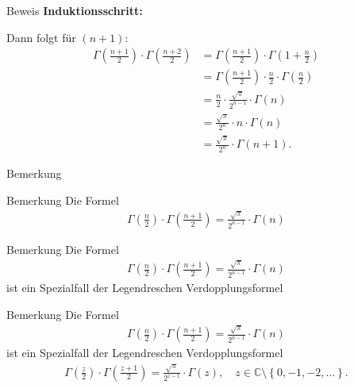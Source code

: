 \documentclass[10pt]{beamer}
\def\bC{\mathbb{C}}
\begin{document}
\begin{frame}{Beweis}
    \textbf{Induktionsschritt:}

    Dann folgt für \( \left( n + 1 \right) \):
    \begin{align*}
        \Gamma\left( \frac{n + 1}{2} \right) \cdot \Gamma\left( \frac{n + 2}{2} \right)
        & = \Gamma\left( \frac{n + 1}{2} \right) \cdot \Gamma\left( 1 + \frac{n}{2} \right) \\
        & = \Gamma\left( \frac{n + 1}{2} \right) \cdot \frac{n}{2} \cdot \Gamma\left( \frac{n}{2} \right) \\
        & = \frac{n}{2} \cdot \frac{\sqrt{\pi}}{2^{n - 1}} \cdot \Gamma\left( n \right) \\
        & = \frac{\sqrt{\pi}}{2^{n}} \cdot n \cdot \Gamma\left( n \right) \\
        & = \frac{\sqrt{\pi}}{2^{n}} \cdot \Gamma\left( n + 1 \right).
    \end{align*}
\end{frame}



\begin{frame}{Bemerkung}
    
\end{frame}



\begin{frame}{Bemerkung}
    Die Formel
    \begin{align*}
        \Gamma\left( \frac{n}{2} \right) \cdot \Gamma\left( \frac{n + 1}{2} \right) 
            = \frac{\sqrt{\pi}}{2^{n - 1}} \cdot \Gamma\left( n \right)
    \end{align*}
\end{frame}



\begin{frame}{Bemerkung}
    Die Formel
    \begin{align*}
        \Gamma\left( \frac{n}{2} \right) \cdot \Gamma\left( \frac{n + 1}{2} \right) 
        = \frac{\sqrt{\pi}}{2^{n - 1}} \cdot \Gamma\left( n \right)
    \end{align*}
    ist ein Spezialfall der Legendreschen Verdopplungsformel
\end{frame}



\begin{frame}{Bemerkung}
    Die Formel
    \begin{align*}
        \Gamma\left( \frac{n}{2} \right) \cdot \Gamma\left( \frac{n + 1}{2} \right) 
        = \frac{\sqrt{\pi}}{2^{n - 1}} \cdot \Gamma\left( n \right)
    \end{align*}
    ist ein Spezialfall der Legendreschen Verdopplungsformel
    \begin{align*}
        \Gamma\left( \frac{z}{2} \right) \cdot \Gamma\left( \frac{z + 1}{2} \right) 
        = \frac{\sqrt{\pi}}{2^{z - 1}} \cdot \Gamma\left( z \right), \quad z \in \bC \setminus \left\{ 0, -1, -2, \ldots \right\}.
    \end{align*}
\end{frame}
\end{document}
